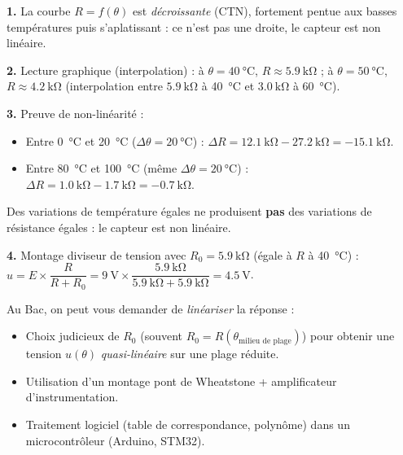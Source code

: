\documentclass[11pt]{article}
\newcommand{\cle}[1]{{\popxbold\color{popdark}#1}}
\begin{document}
\begin{corrige}
\textbf{1.} La courbe $R = f(\theta)$ est \emph{décroissante} (CTN), fortement pentue aux basses températures puis s'aplatissant : ce n'est pas une droite, le capteur est \cle{non linéaire}.

\textbf{2.} Lecture graphique (interpolation) : à $\theta = \SI{40}{\celsius}$, $R \approx \SI{5,9}{\kilo\ohm}$ ; à $\theta = \SI{50}{\celsius}$, $R \approx \SI{4,2}{\kilo\ohm}$ (interpolation entre $\SI{5,9}{\kilo\ohm}$ à \SI{40}{\celsius} et $\SI{3,0}{\kilo\ohm}$ à \SI{60}{\celsius}).

\textbf{3.} Preuve de non-linéarité : 
\begin{itemize}
\item Entre \SI{0}{\celsius} et \SI{20}{\celsius} ($\Delta\theta = \SI{20}{\celsius}$) : $\Delta R = \SI{12,1}{\kilo\ohm} - \SI{27,2}{\kilo\ohm} = \SI{-15,1}{\kilo\ohm}$.
\item Entre \SI{80}{\celsius} et \SI{100}{\celsius} (même $\Delta\theta = \SI{20}{\celsius}$) : $\Delta R = \SI{1,0}{\kilo\ohm} - \SI{1,7}{\kilo\ohm} = \SI{-0,7}{\kilo\ohm}$.
\end{itemize}
Des variations de température égales ne produisent \textbf{pas} des variations de résistance égales : le capteur est \cle{non linéaire}.

\textbf{4.} Montage diviseur de tension avec $R_0 = \SI{5,9}{\kilo\ohm}$ (égale à $R$ à \SI{40}{\celsius}) : $u = E \times \dfrac{R}{R + R_0} = \SI{9}{\volt} \times \dfrac{\SI{5,9}{\kilo\ohm}}{\SI{5,9}{\kilo\ohm} + \SI{5,9}{\kilo\ohm}} = \SI{4,5}{\volt}$.
\end{corrige}

\begin{attention}
Au Bac, on peut vous demander de \emph{linéariser} la réponse : 
\begin{itemize}
\item Choix judicieux de $R_0$ (souvent $R_0 = R(\theta_{\text{milieu de plage}})$) pour obtenir une tension $u(\theta)$ \emph{quasi-linéaire} sur une plage réduite.
\item Utilisation d'un montage pont de Wheatstone + amplificateur d'instrumentation.
\item Traitement logiciel (table de correspondance, polynôme) dans un microcontrôleur (Arduino, STM32).
\end{itemize}
\end{attention}
\end{document}
